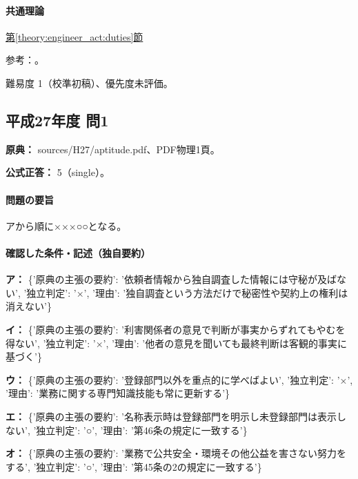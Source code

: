 \paragraph{共通理論} \hyperref[theory:engineer_act:duties]{第\ref*{theory:engineer_act:duties}節}

\par 参考：\cite{engineer_act_current}。

\par 難易度 1（校準初稿）、優先度未評価。

\subsection{平成27年度 問1}
\label{q:h27-reg-apt-01}

\noindent\textbf{原典：} sources/H27/aptitude.pdf、PDF物理1頁。

\textbf{公式正答：} 5（single）。

\paragraph{問題の要旨} アから順に×××○○となる。

\paragraph{確認した条件・記述（独自要約）}\mbox{}\par

\noindent\textbf{ア：} \{'原典の主張の要約': '依頼者情報から独自調査した情報には守秘が及ばない', '独立判定': '×', '理由': '独自調査という方法だけで秘密性や契約上の権利は消えない'\}\par

\noindent\textbf{イ：} \{'原典の主張の要約': '利害関係者の意見で判断が事実からずれてもやむを得ない', '独立判定': '×', '理由': '他者の意見を聞いても最終判断は客観的事実に基づく'\}\par

\noindent\textbf{ウ：} \{'原典の主張の要約': '登録部門以外を重点的に学べばよい', '独立判定': '×', '理由': '業務に関する専門知識技能も常に更新する'\}\par

\noindent\textbf{エ：} \{'原典の主張の要約': '名称表示時は登録部門を明示し未登録部門は表示しない', '独立判定': '○', '理由': '第46条の規定に一致する'\}\par

\noindent\textbf{オ：} \{'原典の主張の要約': '業務で公共安全・環境その他公益を害さない努力をする', '独立判定': '○', '理由': '第45条の2の規定に一致する'\}\par

